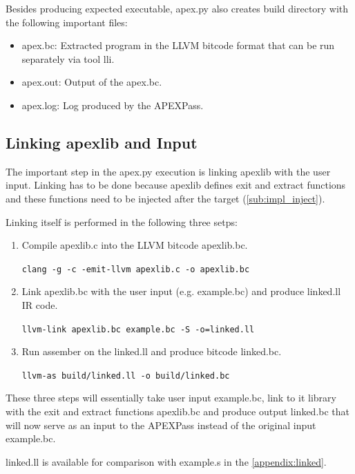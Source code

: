 \documentclass[12pt, twoside]{fithesis2}
\renewcommand{\_}{\leavevmode \kern0.07em\vbox{\hrule width0.4em}}
\newcommand{\squarebullet}{\textcolor{black}{\raisebox{0.15em}{\rule{4pt}{4pt}}}}
\newenvironment{myItemize}{
  \begin{itemize}[
    leftmargin=2em,
    rightmargin=1em,
    itemsep=\parskip,
    parsep=0em,
    topsep=0em,
    partopsep=0em
]
  \renewcommand{\labelitemi}{\squarebullet}
  \renewcommand{\labelitemii}{\textbullet}
}{
  \end{itemize}
}
\newenvironment{myEnumerate}{
  \begin{enumerate}[
    leftmargin=2em,
    rightmargin=1em,
    itemsep=\parskip,
    parsep=0em,
    topsep=0em,
    partopsep=0em
]
}{
  \end{enumerate}
}
\begin{document}
Besides producing expected executable, apex.py also creates build directory
with the following important files:

\begin{myItemize}
\item apex.bc: Extracted program in the LLVM bitcode format that can be run
separately via tool lli.
\item apex.out: Output of the apex.bc.
\item apex.log: Log produced by the APEXPass.
\end{myItemize}

\subsection{Linking apexlib and Input}

The important step in the apex.py execution is linking apexlib with the user
input. Linking has to be done because apexlib defines exit and extract
functions and these functions need to be injected after the target
(\autoref{sub:impl_inject}).

Linking itself is performed in the following three setps:
\begin{myEnumerate}
\item Compile apexlib.c into the LLVM bitcode apexlib.bc.

\texttt{clang -g -c -emit-llvm apexlib.c -o apexlib.bc}

\item Link apexlib.bc with the user input (e.g. example.bc) and produce linked.ll
IR code.

\texttt{llvm-link apexlib.bc example.bc -S -o=linked.ll}

\item Run assember on the linked.ll and produce bitcode linked.bc.

\texttt{llvm-as build/linked.ll -o build/linked.bc}

\end{myEnumerate}

These three steps will essentially take user input example.bc, link to it
library with the exit and extract functions apexlib.bc and produce output
linked.bc that will now serve as an input to the APEXPass instead of the original
input example.bc.

linked.ll is available for comparison with example.s in the
\autoref{appendix:linked}.
\end{document}

